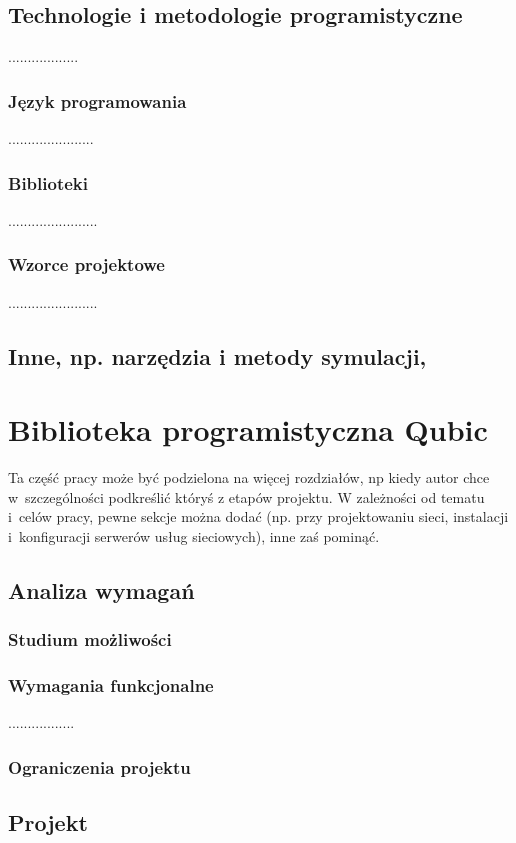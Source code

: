 \documentclass[12pt]{report}
\begin{document}
\section{Technologie i metodologie programistyczne}
..................
\subsection{Język programowania}
......................
\subsection{Biblioteki}
.......................
\subsection{Wzorce projektowe}
.......................

\section{Inne, np. narzędzia i metody symulacji, }

\chapter{Biblioteka programistyczna Qubic} \label{rozdz.czesc.prakt}
Ta część pracy może być podzielona na więcej rozdziałów, np kiedy autor chce
w~szczególności podkreślić któryś z etapów projektu. W zależności od tematu i~celów pracy, pewne sekcje można dodać (np. przy projektowaniu sieci, instalacji
i~konfiguracji serwerów usług sieciowych), inne zaś pominąć.

\section{Analiza wymagań}
\subsection{Studium możliwości}
\subsection{Wymagania funkcjonalne}
.................
\subsection{Ograniczenia projektu}

\section{Projekt}
\end{document}
